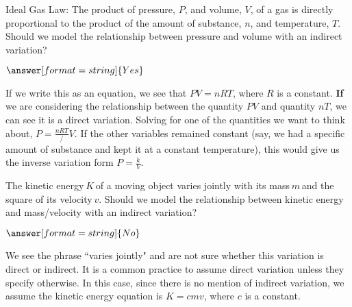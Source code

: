 \documentclass{ximera}
\begin{document}
\begin{question}
[Chemistry] Ideal Gas Law: The product of pressure, $P$, and volume, $V$, of a gas is directly proportional to the product of the amount of substance, $n$, and temperature, $T$. Should we model the relationship between pressure and volume with an indirect variation?
	
$\answer[format=string]{Yes}$
	
\begin{feedback}
	If we write this as an equation, we see that $PV = nRT$, where $R$ is a constant. \textbf{If} we are considering the relationship between the quantity $PV$ and quantity $nT$, we can see it is a direct variation. Solving for one of the quantities we want to think about, $P = \frac{nRT}/{V}$. If the other variables remained constant (say, we had a specific amount of substance and kept it at a constant temperature), this would give us the inverse variation form $P = \frac{k}{V}$. 
\end{feedback}
\end{question}

\begin{question}
[Physics] The kinetic energy $K$ of a moving object varies jointly with its mass $m$ and the square of its velocity $v$. Should we model the relationship between kinetic energy and mass/velocity with an indirect variation?

$\answer[format=string]{No}$

\begin{feedback}
We see the phrase ``varies jointly" and are not sure whether this variation is direct or indirect. It is a common practice to assume direct variation unless they specify otherwise. In this case, since there is no mention of indirect variation, we assume the kinetic energy equation is $K = c mv$, where $c$ is a constant. 
\end{feedback}

\end{question}
\end{document}
